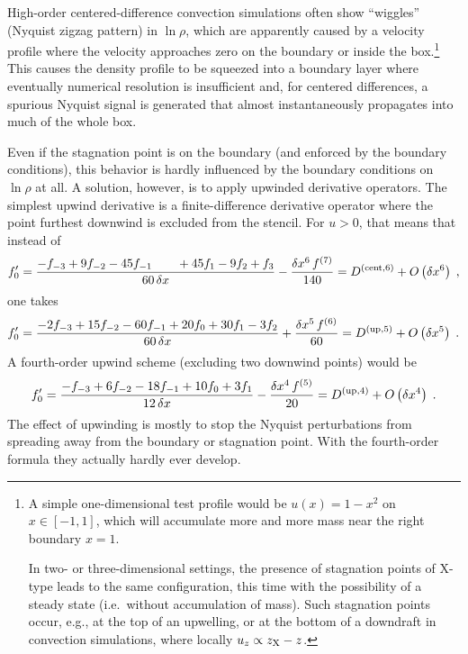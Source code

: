 \documentclass[\mydriver,12pt,twoside,notitlepage,a4paper]{article}
\begin{document}
High-order centered-difference convection simulations often show
``wiggles'' (Nyquist zigzag pattern) in $\ln\rho$, which are apparently
caused by a velocity profile where the velocity approaches zero on the
boundary or inside the box.\footnote{%
  A simple one-dimensional test profile would be $u(x) = 1-x^2$ on $x \in
  [-1,1]$, which will accumulate more and more mass near the right
  boundary $x=1$.

  In two- or three-dimensional settings, the presence of stagnation points
  of X-type leads to the same configuration, this time with the
  possibility of a steady state (i.e.~without accumulation of mass).
  Such stagnation points occur, e.g., at the top of an upwelling, or at
  the bottom of a downdraft in convection simulations, where locally
  $u_z \propto z_{\rm X}-z$.
}
This causes the density profile to be squeezed into a boundary layer where
eventually numerical resolution is insufficient and, for centered
differences, a spurious Nyquist signal is generated that almost
instantaneously propagates into much of the whole box.

Even if the stagnation point is on the boundary (and enforced by the
boundary conditions), this behavior is hardly influenced by the boundary
conditions on $\ln\rho$ at all.
A solution, however, is to apply upwinded derivative operators.
The simplest upwind derivative is a finite-difference derivative operator
where the point furthest downwind is excluded from the stencil.
For $u>0$, that means that instead of
\begin{equation}
  f'_0
  = \frac{-f_{-3} + 9 f_{-2} - 45 f_{-1} \qquad
           + 45 f_{1} - 9 f_{2} + f_{3}}
         {60\,\delta x}
    - \frac{\delta x^6\,f^{(7)}}{140}
  = D^{\rm(cent,6)} + O\left(\delta x^6\right) \; ,
\end{equation}
one takes
\begin{equation}
  f'_0
  = \frac{-2 f_{-3} + 15 f_{-2} - 60 f_{-1} + 20 f_{0} + 30 f_{1} - 3 f_{2}}
         {60\,\delta x}
    + \frac{\delta x^5\,f^{(6)}}{60}
  = D^{\rm(up,5)} + O\left(\delta x^5\right) \; .
\end{equation}
A fourth-order upwind scheme (excluding two downwind points) would be
\begin{equation}
  f'_0
  = \frac{-f_{-3} + 6 f_{-2} - 18 f_{-1} + 10 f_{0} + 3 f_{1}}
         {12\,\delta x}
    - \frac{\delta x^4\,f^{(5)}}{20}
  = D^{\rm(up,4)} + O\left(\delta x^4\right) \; .
\end{equation}
The effect of upwinding is mostly to stop the Nyquist perturbations from
spreading away from the boundary or stagnation point.
With the fourth-order formula they actually hardly ever develop.
\end{document}
